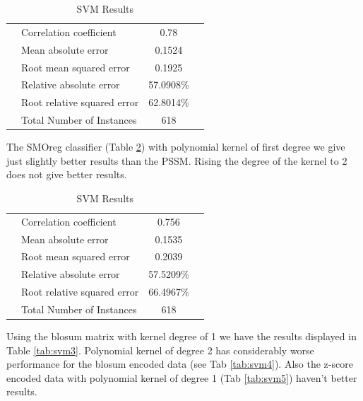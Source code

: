 \begin{table}[ht]
\begin{center}
\begin{tabular}{ ll c r }
\hline
 & Correlation coefficient &                 0.78  \\
 & Mean absolute error      &                0.1524 \\
 & Root mean squared error   &               0.1925 \\
 & Relative absolute error    &             57.0908\%  \\
 & Root relative squared error &            62.8014\%  \\
 & Total Number of Instances    &          618 \\
\hline
\end{tabular}
\label{tab:svm1}
\caption{SVM Results}
\end{center}
\end{table}


The SMOreg classifier (Table \ref{tab:svm2}) with polynomial kernel of first degree we give just slightly better results than the PSSM. Rising the degree of the kernel to 2 does not give better results.

\begin{table}[ht]
\begin{center}
\begin{tabular}{ ll c r }
\hline
 & Correlation coefficient &                 0.756 \\
 & Mean absolute error      &                0.1535 \\
 & Root mean squared error   &               0.2039 \\
 & Relative absolute error   &              57.5209\% \\
 & Root relative squared error &            66.4967\% \\
 & Total Number of Instances    &          618 \\
\hline
\end{tabular}
\label{tab:svm2}
\caption{SVM Results}

\end{center}
\end{table}

Using the blosum matrix with kernel degree of 1 we have the results displayed in Table \ref{tab:svm3}. Polynomial kernel of degree 2 has considerably worse performance for the blosum encoded data (see Tab \ref{tab:svm4}). Also the z-score encoded data with polynomial kernel of degree 1 (Tab \ref{tab:svm5}) haven't better results.



